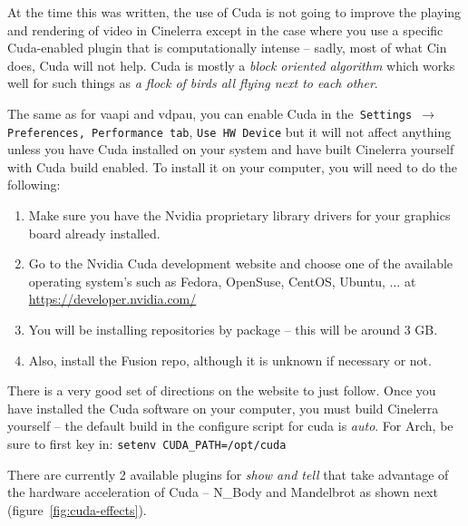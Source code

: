 At the time this was written, the use of Cuda is not going to improve the playing and rendering of video in Cinelerra except in the case where you use a specific Cuda-enabled plugin that is computationally intense -- sadly, most of what Cin does, Cuda will not help.  Cuda is mostly a \textit{block oriented algorithm} which works well for such things as \textit{a flock of birds all flying next to each other}.

The same as for vaapi and vdpau, you can enable Cuda in the\texttt{ Settings $\rightarrow$ Preferences, Performance tab}, \texttt{Use HW Device} but it will not affect anything unless you have Cuda installed on your system and have built Cinelerra yourself with Cuda build enabled.  To install it on your computer, you will need to do the following:

\begin{enumerate}
	\item Make sure you have the Nvidia proprietary library drivers for your graphics board already installed.
	\item Go to the Nvidia Cuda development website and choose one of the available operating system’s
	such as Fedora, OpenSuse, CentOS, Ubuntu, $\dots$ at   \url{https://developer.nvidia.com/}
	\item You will be installing repositories by package -- this will be around 3 GB.
	\item Also, install the Fusion repo, although it is unknown if necessary or not.
\end{enumerate}

There is a very good set of directions on the website to just follow.  Once you have installed the Cuda software on your computer, you must build Cinelerra yourself -- the default build in the configure script for cuda is \textit{auto}.  For Arch, be sure to first key in:     \texttt{setenv CUDA\_PATH=/opt/cuda} 

There are currently 2 available plugins for \textit{show and tell} that take advantage of the hardware acceleration of Cuda -- N\_Body and Mandelbrot as shown next (figure~\ref{fig:cuda-effects}).

